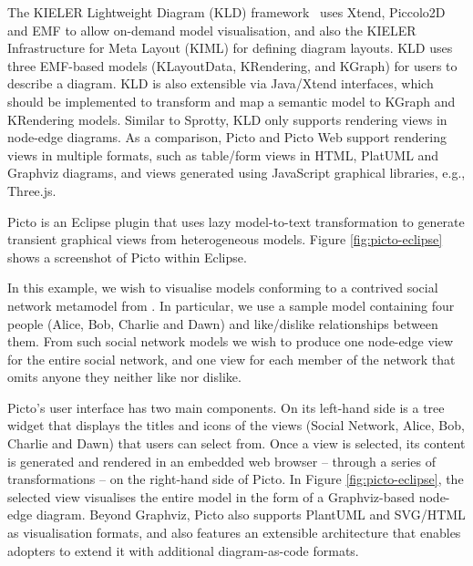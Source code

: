 \documentclass[preprint,12pt, a4paper]{elsarticle}
\begin{document}
The KIELER Lightweight Diagram (KLD) framework~\cite{schneider2013just} uses Xtend, Piccolo2D and EMF to allow on-demand model visualisation, and also the KIELER Infrastructure for Meta Layout (KIML) for defining diagram layouts. KLD uses three EMF-based models (KLayoutData, KRendering, and KGraph) for users to describe a diagram. KLD is also extensible via Java/Xtend interfaces, which should be implemented to transform and map a semantic model to KGraph and KRendering models. Similar to Sprotty, KLD only supports rendering views in node-edge diagrams. As a comparison, Picto and Picto Web support rendering views in multiple formats, such as table/form views in HTML, PlatUML and Graphviz diagrams, and views generated using JavaScript graphical libraries, e.g., Three.js.

Picto \cite{dimitris2020picto} is an Eclipse plugin that uses lazy model-to-text transformation to generate transient graphical views from heterogeneous models. Figure \ref{fig:picto-eclipse} shows a screenshot of Picto within Eclipse. 

In this example, we wish to visualise models conforming to a contrived social network metamodel from \cite{dimitris2020picto}. In particular, we use a sample model containing four people (Alice, Bob,  Charlie and Dawn) and like/dislike relationships between them. From such social network models we wish to produce one node-edge view for the entire social network, and one view for each member of the network that omits anyone they neither like nor dislike.

Picto’s user interface has two main components. On its left-hand side is a tree widget that displays the titles and icons of the views (Social Network, Alice, Bob, Charlie and Dawn) that users can select from. Once a view is selected, its content is generated and rendered in an embedded web browser -- through a series of transformations -- on the right-hand side of Picto. In Figure \ref{fig:picto-eclipse}, the selected view visualises the entire model in the form of a Graphviz-based node-edge diagram. Beyond Graphviz, Picto also supports PlantUML and SVG/HTML as visualisation formats, and also features an extensible architecture that enables adopters to extend it with additional diagram-as-code formats.  
\end{document}

